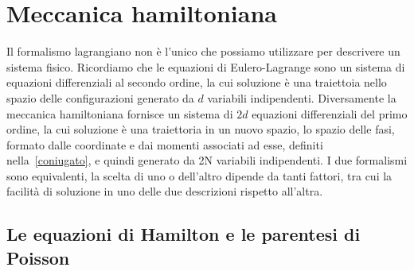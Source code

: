 \section{Meccanica hamiltoniana}

    Il formalismo lagrangiano non è l'unico che possiamo utilizzare per descrivere un sistema fisico. Ricordiamo che le equazioni di Eulero-Lagrange sono un sistema di equazioni differenziali al secondo ordine, la cui soluzione è una traiettoia nello spazio delle configurazioni generato da $d$ variabili indipendenti. Diversamente la meccanica hamiltoniana fornisce un sistema di $2d$ equazioni differenziali del primo ordine, la cui soluzione è una traiettoria in un nuovo spazio, lo spazio delle fasi, formato dalle coordinate e dai momenti associati ad esse, definiti nella~\eqref{coniugato}, e quindi generato da 2N variabili indipendenti. I due formalismi sono equivalenti, la scelta di uno o dell'altro dipende da tanti fattori, tra cui la facilità di soluzione in uno delle due descrizioni rispetto all'altra.
    
\subsection{Le equazioni di Hamilton e le parentesi di Poisson}

